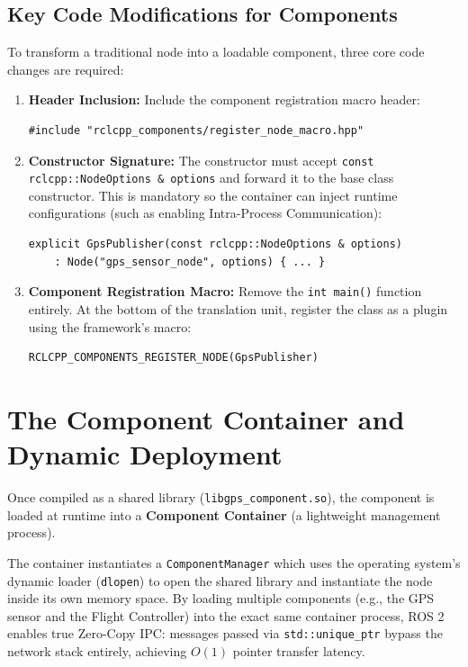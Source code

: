 \documentclass{article}
\begin{document}
\subsection{Key Code Modifications for Components}
To transform a traditional node into a loadable component, three core code changes are required:
\begin{enumerate}
    \item \textbf{Header Inclusion:} Include the component registration macro header:
\begin{verbatim}
#include "rclcpp_components/register_node_macro.hpp"
\end{verbatim}
    \item \textbf{Constructor Signature:} The constructor must accept \texttt{const rclcpp::NodeOptions \& options} and forward it to the base class constructor. This is mandatory so the container can inject runtime configurations (such as enabling Intra-Process Communication):
\begin{verbatim}
explicit GpsPublisher(const rclcpp::NodeOptions & options) 
    : Node("gps_sensor_node", options) { ... }
\end{verbatim}
    \item \textbf{Component Registration Macro:} Remove the \texttt{int main()} function entirely. At the bottom of the translation unit, register the class as a plugin using the framework's macro:
\begin{verbatim}
RCLCPP_COMPONENTS_REGISTER_NODE(GpsPublisher)
\end{verbatim}
\end{enumerate}

\section{The Component Container and Dynamic Deployment}
Once compiled as a shared library (\texttt{libgps\_component.so}), the component is loaded at runtime into a \textbf{Component Container} (a lightweight management process). 

The container instantiates a \texttt{ComponentManager} which uses the operating system's dynamic loader (\texttt{dlopen}) to open the shared library and instantiate the node inside its own memory space. By loading multiple components (e.g., the GPS sensor and the Flight Controller) into the exact same container process, ROS 2 enables true Zero-Copy IPC: messages passed via \texttt{std::unique\_ptr} bypass the network stack entirely, achieving $O(1)$ pointer transfer latency.
\end{document}
